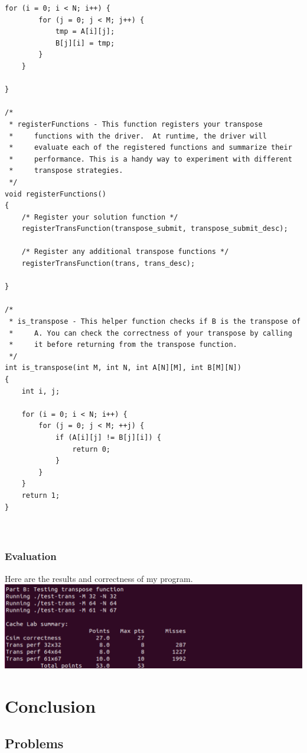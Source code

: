 \documentclass{article}
\begin{document}
\begin{lstlisting}[title=trans.c, frame=shadowbox]
    for (i = 0; i < N; i++) {
        for (j = 0; j < M; j++) {
            tmp = A[i][j];
            B[j][i] = tmp;
        }
    }    

}

/*
 * registerFunctions - This function registers your transpose
 *     functions with the driver.  At runtime, the driver will
 *     evaluate each of the registered functions and summarize their
 *     performance. This is a handy way to experiment with different
 *     transpose strategies.
 */
void registerFunctions()
{
    /* Register your solution function */
    registerTransFunction(transpose_submit, transpose_submit_desc); 

    /* Register any additional transpose functions */
    registerTransFunction(trans, trans_desc); 

}

/* 
 * is_transpose - This helper function checks if B is the transpose of
 *     A. You can check the correctness of your transpose by calling
 *     it before returning from the transpose function.
 */
int is_transpose(int M, int N, int A[N][M], int B[M][N])
{
    int i, j;

    for (i = 0; i < N; i++) {
        for (j = 0; j < M; ++j) {
            if (A[i][j] != B[j][i]) {
                return 0;
            }
        }
    }
    return 1;
}



\end{lstlisting}
\subsubsection{Evaluation}

Here are the results and correctness of my program.\\


\includegraphics[scale=0.43]{8.png}


\section{Conclusion}

\subsection{Problems}
\end{document}
